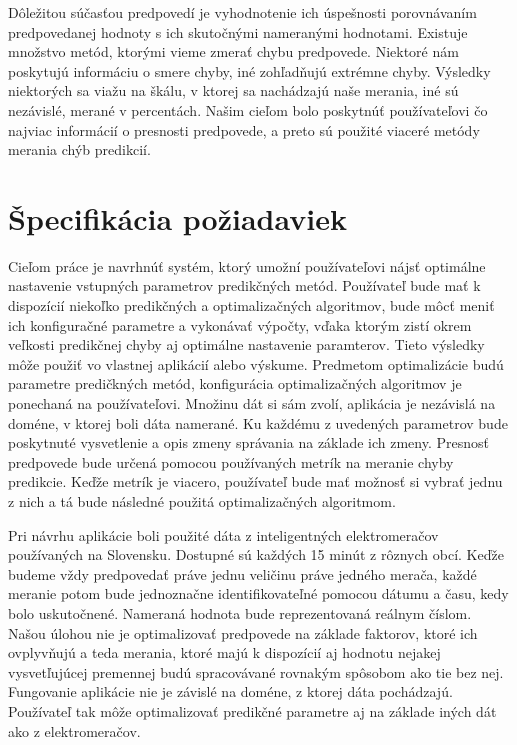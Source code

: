 \documentclass[a4paper,slovak,12pt,appendix]{article}
\begin{document}
Dôležitou súčasťou predpovedí je vyhodnotenie ich úspešnosti porovnávaním
predpovedanej hodnoty s ich skutočnými nameranými hodnotami. Existuje množstvo
metód, ktorými vieme zmerať chybu predpovede. Niektoré nám poskytujú informáciu
o smere chyby, iné zohľadňujú extrémne chyby. Výsledky niektorých sa viažu na
škálu, v ktorej sa nachádzajú naše merania, iné sú nezávislé, merané v
percentách. Našim cieľom bolo poskytnúť používateľovi čo najviac informácií
o presnosti predpovede, a preto sú použité viaceré metódy merania chýb
predikcií.


\newpage
\section{Špecifikácia požiadaviek}
\label{specification}
Cieľom práce je navrhnúť systém, ktorý umožní používateľovi nájsť optimálne
nastavenie vstupných parametrov predikčných metód. Používateľ bude mať
k dispozícií niekoľko predikčných a optimalizačných algoritmov, bude môcť
meniť ich konfiguračné parametre a vykonávať výpočty, vďaka ktorým zistí okrem
veľkosti predikčnej chyby aj optimálne nastavenie paramterov. Tieto výsledky
môže použiť vo vlastnej aplikácií alebo výskume. Predmetom optimalizácie budú
parametre predičkných metód, konfigurácia optimalizačných algoritmov je
ponechaná na používateľovi. Množinu dát si sám zvolí, aplikácia
je nezávislá na doméne, v ktorej boli dáta namerané. Ku každému z uvedených
parametrov bude poskytnuté vysvetlenie a opis zmeny správania na základe
ich zmeny. Presnosť predpovede bude určená pomocou používaných metrík na
meranie chyby predikcie. Keďže metrík je viacero, používateľ bude mať možnosť
si vybrať jednu z nich a tá bude následné použitá optimalizačných algoritmom.

Pri návrhu aplikácie boli použité dáta z inteligentných elektromeračov
používaných na Slovensku. Dostupné sú každých 15 minút z rôznych obcí. Keďže
budeme vždy predpovedať práve jednu veličinu práve jedného merača, každé
meranie potom bude jednoznačne identifikovateľné pomocou dátumu a času, kedy
bolo uskutočnené. Nameraná hodnota bude reprezentovaná reálnym číslom.
Našou úlohou nie je optimalizovať predpovede na základe faktorov, ktoré ich
ovplyvňujú a teda merania, ktoré majú k dispozícií aj hodnotu nejakej vysvetľujúcej
premennej budú spracovávané rovnakým spôsobom ako tie bez nej. Fungovanie
aplikácie nie je závislé na doméne, z ktorej dáta pochádzajú. Používateľ tak
môže optimalizovať predikčné parametre aj na základe iných dát ako z elektromeračov.
\end{document}
